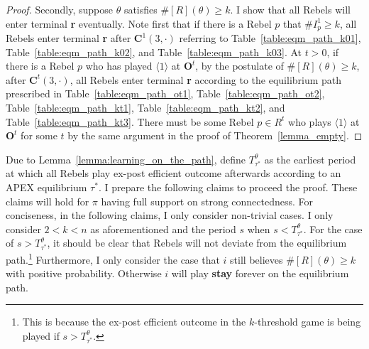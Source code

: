 \documentclass[12pt,letter]{article}
\newcommand{\Kappa}{\mathbf{C}}
\newcommand{\Omicron}{\mathbf{O}}
\theoremstyle{definition}
\theoremstyle{remark}
\theoremstyle{claim}
\begin{document}
\begin{proof}
Secondly, suppose $\theta$ satisfies $\#[R](\theta)\geq k$. I show that all Rebels will enter terminal \textbf{r} eventually. Note first that if there is a Rebel $p$ that $\#I^1_p\geq k$, all Rebels enter terminal \textbf{r} after $\Kappa^1(3,\cdot)$ referring to Table~\ref{table:eqm_path_k01}, Table~\ref{table:eqm_path_k02}, and Table~\ref{table:eqm_path_k03}. At $t>0$, if there is a Rebel $p$ who has played $\langle 1 \rangle$ at $\Omicron^t$, by the postulate of $\#[R](\theta)\geq k$, after $\Kappa^t(3,\cdot)$, all Rebels enter terminal \textbf{r} according to the equilibrium path prescribed in Table~\ref{table:eqm_path_ot1}, Table~\ref{table:eqm_path_ot2}, Table~\ref{table:eqm_path_kt1}, Table~\ref{table:eqm_path_kt2}, and Table~\ref{table:eqm_path_kt3}. There must be some Rebel $p\in R^t$ who plays $\langle 1 \rangle$ at $\Omicron^t$ for some $t$ by the same argument in the proof of Theorem~\ref{lemma_empty}.
\end{proof}


Due to Lemma~\ref{lemma:learning_on_the_path}, define $T^{\theta}_{\tau^{*}}$ as the earliest period at which all Rebels play ex-post efficient outcome afterwards according to an APEX equilibrium $\tau^{*}$.  I prepare the following claims to proceed the proof. These claims will hold for $\pi$ having full support on strong connectedness. For conciseness, in the following claims, I only consider non-trivial cases. I only consider $2<k<n$ as aforementioned and the period $s$ when $s<T^{\theta}_{\tau^{*}}$. For the case of $s>T^{\theta}_{\tau^{*}}$, it should be clear that Rebels will not deviate from the equilibrium path.\footnote{This is because the ex-post efficient outcome in the $k$-threshold game is being played if $s>T^{\theta}_{\tau^{*}}$.}
Furthermore, I only consider the case that $i$ still believes $\#[R](\theta)\geq k$ with positive probability. Otherwise $i$ will play \textbf{stay} forever on the equilibrium path. 
\end{document}
